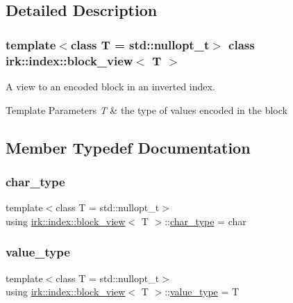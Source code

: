\subsection{Detailed Description}
\subsubsection*{template$<$class T = std\+::nullopt\+\_\+t$>$\newline
class irk\+::index\+::block\+\_\+view$<$ T $>$}

A view to an encoded block in an inverted index.


\begin{DoxyTemplParams}{Template Parameters}
{\em T} & the type of values encoded in the block \\
\hline
\end{DoxyTemplParams}


\subsection{Member Typedef Documentation}
\mbox{\label{classirk_1_1index_1_1block__view_af24362772032fb0ab7364162e0611483}} 
\subsubsection{\texorpdfstring{char\+\_\+type}{char\_type}}
{\footnotesize\ttfamily template$<$class T  = std\+::nullopt\+\_\+t$>$ \\
using \mbox{\hyperlink{classirk_1_1index_1_1block__view}{irk\+::index\+::block\+\_\+view}}$<$ T $>$\+::\mbox{\hyperlink{classirk_1_1index_1_1block__view_af24362772032fb0ab7364162e0611483}{char\+\_\+type}} =  char}

\mbox{\label{classirk_1_1index_1_1block__view_ad79674ad64c94861b74dd15e603c0f8b}} 
\subsubsection{\texorpdfstring{value\+\_\+type}{value\_type}}
{\footnotesize\ttfamily template$<$class T  = std\+::nullopt\+\_\+t$>$ \\
using \mbox{\hyperlink{classirk_1_1index_1_1block__view}{irk\+::index\+::block\+\_\+view}}$<$ T $>$\+::\mbox{\hyperlink{classirk_1_1index_1_1block__view_ad79674ad64c94861b74dd15e603c0f8b}{value\+\_\+type}} =  T}



